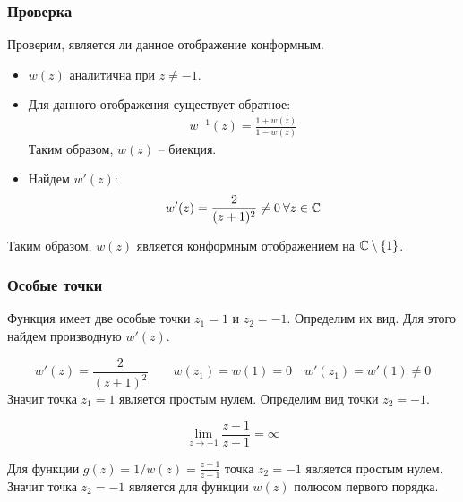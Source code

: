 \begin{frame}\frametitle{Проверка}
Проверим, является ли данное отображение конформным.

\begin{itemize}
\item
\(w(z)\) аналитична при \(z \neq -1\).

\item
Для данного отображения существует обратное:
\begin{align*}
	w^{-1}(z) = \frac{1+w(z)}{1 - w(z)}
\end{align*}
Таким образом, \(w(z)\) -- биекция.

\item Найдем \(w'(z)\):
\begin{align*}
	w'(z) = \frac{2}{(z+1)^2} \neq 0 \: \forall z \in \mathbb{C}
\end{align*}
\end{itemize}

Таким образом, \(w(z)\) является конформным отображением
на \(\mathbb{C} \setminus \{1\}\).
\end{frame}

\begin{frame}\frametitle{Особые точки}
	Функция имеет две особые точки \(z_1 = 1\) и \(z_2 = -1\).
	Определим их вид.
	Для этого найдем производную \(w'(z)\).

	\[
		w'(z) = \frac{2}{(z+1)^2}
		\qquad
		w(z_1) = w(1) = 0
		\quad
		w'(z_1) = w'(1) \neq 0
	\]
	Значит точка \(z_1 = 1\) является простым нулем.
	Определим вид точки \(z_2 = -1\).

	\[ \lim_{z \to -1} \frac{z-1}{z+1} = \infty \]

	Для функции \(g(z) = 1/w(z) = \frac{z+1}{z-1}\)
	точка \(z_2 = -1\) является простым нулем.
	Значит точка \(z_2 = -1\) является для функции \(w(z)\) полюсом первого порядка.

\end{frame}


